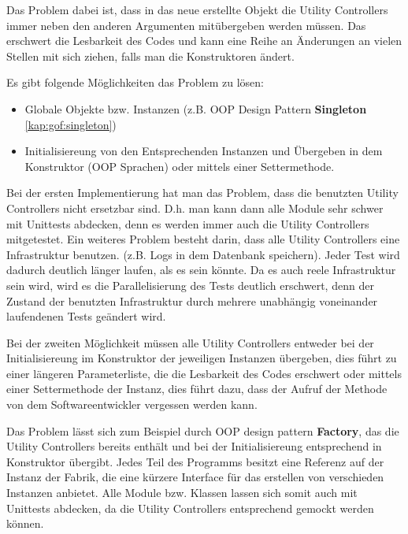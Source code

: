 \documentclass{article}
\begin{document}
    Das Problem dabei ist, dass in das neue erstellte Objekt die Utility Controllers immer neben den anderen Argumenten 
    mitübergeben werden müssen. Das erschwert die Lesbarkeit des Codes und kann eine Reihe an Änderungen an vielen Stellen mit sich ziehen,
    falls man die Konstruktoren ändert.
    
    Es gibt folgende Möglichkeiten das Problem zu lösen:
    \begin{itemize}
        \item Globale Objekte bzw. Instanzen (z.B. OOP Design Pattern \textbf{Singleton} \ref{kap:gof:singleton})
        \item Initialisiereung von den Entsprechenden Instanzen und Übergeben in dem Konstruktor (OOP Sprachen)
        oder mittels einer Settermethode.
    \end{itemize}

    Bei der ersten Implementierung hat man das Problem, dass die benutzten Utility Controllers nicht ersetzbar sind.
    D.h. man kann dann alle Module sehr schwer mit Unittests abdecken, denn es werden immer auch die Utility Controllers mitgetestet.
    Ein weiteres Problem besteht darin, dass alle Utility Controllers eine Infrastruktur benutzen.
    (z.B. Logs in dem Datenbank speichern). Jeder Test wird dadurch deutlich länger laufen, als es sein könnte.
    Da es auch reele Infrastruktur sein wird, wird es die Parallelisierung des Tests deutlich erschwert, denn 
    der Zustand der benutzten Infrastruktur durch mehrere unabhängig voneinander laufendenen Tests geändert wird.

    Bei der zweiten Möglichkeit müssen alle Utility Controllers entweder bei der Initialisiereung im Konstruktor 
    der jeweiligen Instanzen übergeben, dies führt zu einer längeren Parameterliste,
    die die Lesbarkeit des Codes erschwert oder mittels einer Settermethode der Instanz,
    dies führt dazu, dass der Aufruf der Methode von dem Softwareentwickler vergessen werden kann.
    
    Das Problem lässt sich zum Beispiel durch OOP design pattern \textbf{Factory}, das die Utility Controllers bereits
    enthält und bei der Initialisiereung entsprechend in Konstruktor übergibt. 
    Jedes Teil des Programms besitzt eine Referenz auf der Instanz der Fabrik, 
    die eine kürzere Interface für das erstellen von verschieden Instanzen anbietet.
    Alle Module bzw. Klassen lassen sich somit auch mit Unittests
    abdecken, da die Utility Controllers entsprechend gemockt werden können. 
\end{document}
